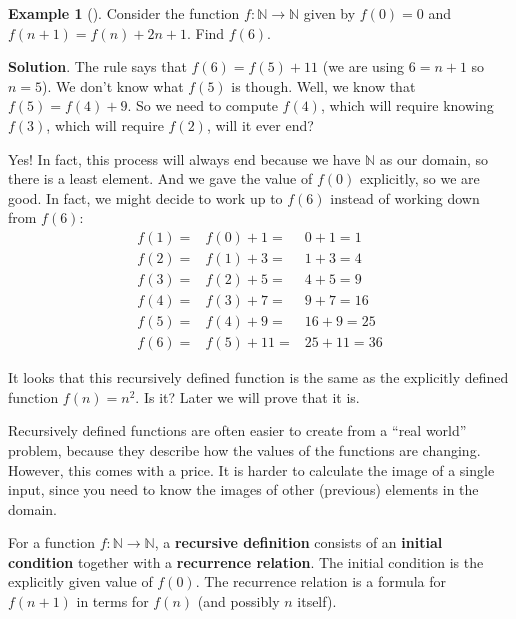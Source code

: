 \documentclass[10pt,]{book}
\newcommand{\terminology}[1]{\textbf{#1}}
\theoremstyle{plain}
\theoremstyle{definition}
\theoremstyle{definition}
\newtheorem{example}[theorem]{Example}
\theoremstyle{definition}
\theoremstyle{definition}
\numberwithin{equation}{chapter}
\def\N{\mathbb N}
\newcommand{\amp}{&}
\begin{document}
\begin{example}[]\label{example-48}
\hypertarget{p-1724}{}%
Consider the function \(f:\N \to \N\) given by \(f(0) = 0\) and \(f(n+1) = f(n) + 2n+1\).  Find \(f(6)\).%
\par\smallskip%
\noindent\textbf{Solution}.\hypertarget{solution-143}{}\quad%
\hypertarget{p-1725}{}%
The rule says that \(f(6) = f(5) + 11\) (we are using \(6 = n+1\) so \(n = 5\)).  We don't know what \(f(5)\) is though.  Well, we know that \(f(5) = f(4) + 9\).  So we need to compute \(f(4)\), which will require knowing \(f(3)\), which will require \(f(2)\),\textellipsis{} will it ever end?%
\par
\hypertarget{p-1726}{}%
Yes!  In fact, this process will always end because we have \(\N\) as our domain, so there is a least element.  And we gave the value of \(f(0)\) explicitly, so we are good.  In fact, we might decide to work up to \(f(6)\) instead of working down from \(f(6)\):%
\begin{align*}
f(1) = \amp f(0) + 1 = \amp 0 + 1 = 1\\
f(2) = \amp f(1) + 3 = \amp 1 + 3 = 4\\
f(3) = \amp f(2) + 5 = \amp 4 + 5 = 9\\
f(4) = \amp f(3) + 7 = \amp 9 + 7 = 16\\
f(5) = \amp f(4) + 9 = \amp 16 + 9 = 25\\
f(6) = \amp f(5) + 11 = \amp 25 + 11 = 36
\end{align*}
%
\par
\hypertarget{p-1727}{}%
It looks that this recursively defined function is the same as the explicitly defined function \(f(n) = n^2\).  Is it?  Later we will prove that it is.%
\end{example}
\hypertarget{p-1728}{}%
Recursively defined functions are often easier to create from a ``real world'' problem, because they describe how the values of the functions are changing.  However, this comes with a price. It is harder to calculate the image of a single input, since you need to know the images of other (previous) elements in the domain.%
\begin{assemblage}\label{assemblage-26}
\hypertarget{p-1729}{}%
For a function \(f:\N \to \N\), a \terminology{recursive definition} consists of an \terminology{initial condition} together with a \terminology{recurrence relation}.  The initial condition is the explicitly given value of \(f(0)\). The recurrence relation is a formula for \(f(n+1)\) in terms for \(f(n)\) (and possibly \(n\) itself).%
\end{assemblage}
\end{document}
